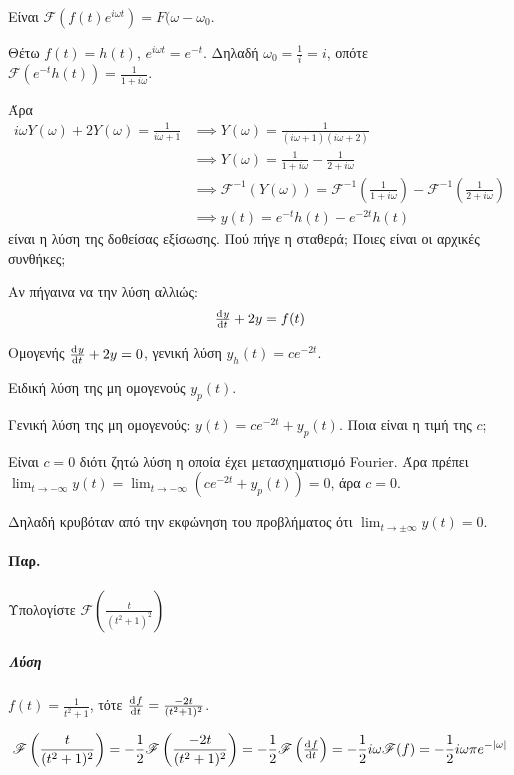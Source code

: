 \documentclass[11pt,a4paper,titlepage,final]{article}
\begin{document}
Είναι \(\mathscr{F}\left(f(t)e^{i\omega t}\right) = F(\omega-\omega_0\).

Θέτω \(f(t)=h(t)\), \(e^{i\omega t}=e^{-t}\). Δηλαδή \(\omega_0=\frac{1}{i}=i\), οπότε \(\mathscr{F}(e^{-t}h(t)) = \frac{1}{1+i\omega}\).

Άρα
\begin{align*}
i\omega Y(\omega)+2Y(\omega)=\frac{1}{i\omega+1} &\implies
Y(\omega) = \frac{1}{(i\omega+1)(i\omega+2)} \\ &\implies
Y(\omega) = \frac{1}{1+i\omega}-\frac{1}{2+i\omega}
\\ &\implies
\mathscr{F}^{-1}\left(Y(\omega)\right)=\mathscr{F}^{-1}\left(\frac{1}{1+i\omega}\right)
- \mathscr{F}^{-1}\left(\frac{1}{2+i\omega}\right)
\\ &\implies 
\boxed{
y(t)=e^{-t}h(t)-e^{-2t}h(t)
}
\end{align*}
είναι η λύση της δοθείσας εξίσωσης. Πού πήγε η σταθερά; Ποιες είναι οι αρχικές συνθήκες;

Αν πήγαινα να την λύση αλλιώς:
\begin{gather*}
\od{y}{t}+2y=f(t)
\end{gather*}

Ομογενής \(\od{y}{t} +2y=0\), γενική λύση \(y_h(t)=ce^{-2t}\).

Ειδική λύση της μη ομογενούς \(y_p(t)\).

Γενική λύση της μη ομογενούς: \(\boxed{y(t)=ce^{-2t}+y_p(t)}\). Ποια είναι η τιμή της \(c\);

Είναι \(c=0\) διότι ζητώ λύση η οποία έχει μετασχηματισμό Fourier. Άρα πρέπει \(
\lim_{t\to -\infty} y(t)=\lim_{t\to -\infty} \left( ce^{-2t}+y_p(t) \right) = 0
\), άρα \(c=0\).

Δηλαδή κρυβόταν από την εκφώνηση του προβλήματος ότι \(\lim_{t\to \pm\infty} y(t)=0\).

\paragraph{Παρ.}
Υπολογίστε \(
\mathscr{F}\left(
\frac{t}{(t^2+1)^2}
\right)
\)
\subparagraph{Λύση}
\(f(t) = \frac{1}{t^2+1}\), τότε \(\od{f}{t} = \frac{-2t}{(t^2+1)^2}\).

\begin{align*}
\mathscr{F}\left(
\frac{t}{(t^2+1)^2}
\right) = -\frac{1}{2} \mathscr{F}\left(
\frac{-2t}{(t^2+1)^2}
\right) = -\frac{1}{2} \mathscr{F}\left(
\od{f}{t}\right) = -\frac{1}{2}i\omega\mathscr{F}(f)=-\frac{1}{2}i\omega\pi e^{-|\omega|}
\end{align*}
\end{document}
